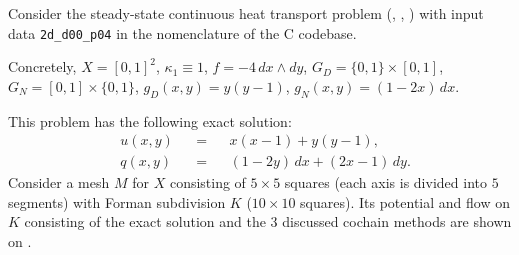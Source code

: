 \begin{example}
  Consider the steady-state continuous heat transport problem
  (,
   ,
   )
  with input data \verb|2d_d00_p04| in the nomenclature of the C codebase.

  Concretely,
    $X = [0, 1]^2$,
    $\kappa_1 \equiv 1$,
    $f = -4 \, d x \wedge d y$,
    $G_D = \{0, 1\} \times [0, 1]$,
    $G_N = [0, 1] \times \{0, 1\}$,
    $g_D(x, y) = y (y - 1)$,
    $g_N(x, y) = (1 - 2 x) \, d x$.

  This problem has the following exact solution:
  \begin{subequations}
    \begin{alignat}{3}
      & u(x, y) && = && x (x - 1) + y (y - 1), \\
      & q(x, y) && = && (1 - 2 y)\, d x + (2 x - 1)\, d y.
    \end{alignat}
  \end{subequations}
  Consider a mesh $M$ for $X$ consisting of $5 \times 5$ squares (each axis is
  divided into $5$ segments) with Forman subdivision $K$
  ($10 \times 10$ squares).
  Its potential and flow on $K$ consisting of the exact solution and the $3$
  discussed cochain methods are shown on
  .
\end{example}
